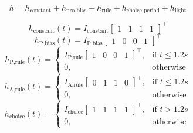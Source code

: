 \documentclass[11pt]{article}
\begin{document}
\begin{equation}
h = h_{\text{constant}} + h_{\text{pro-bias}} + h_{\text{rule}} + h_{\text{choice-period}} + h_{\text{light}}
\end{equation}


\begin{equation} h_{\text{constant}}(t) = I_{\text{constant}} \begin{bmatrix} 1 & 1 & 1 & 1 \end{bmatrix}^\top 
\end{equation}
\begin{equation} h_{\text{P,bias}}(t) = I_{\text{P,bias}} \begin{bmatrix} 1 & 0 & 0 & 1 \end{bmatrix}^\top 
\end{equation}
\begin{equation}h_{\text{P,rule}}(t) = \begin{cases}
                           I_{\text{P,rule}} \begin{bmatrix} 1 & 0 & 0 & 1 \end{bmatrix}^\top,& \text{if } t\leq 1.2s \\
                            0,              & \text{otherwise}
                         \end{cases}
\end{equation}
\begin{equation} h_{\text{A,rule}}(t) = \begin{cases}
                           I_{\text{A,rule}} \begin{bmatrix} 0 & 1 & 1 & 0 \end{bmatrix}^\top,& \text{if } t\leq 1.2s \\
                            0,              & \text{otherwise}
                         \end{cases}
\end{equation}
\begin{equation} h_{\text{choice}}(t) = \begin{cases}
                           I_{\text{choice}} \begin{bmatrix} 1 & 1 & 1 & 1 \end{bmatrix}^\top,& \text{if } t > 1.2s \\
                            0,              & \text{otherwise}
                         \end{cases}
\end{equation}
                         
\end{document}
